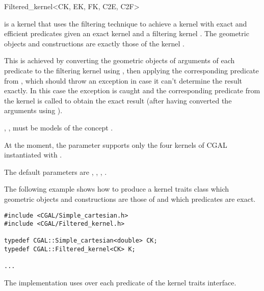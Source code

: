 \begin{ccRefClass}{Filtered_kernel<CK, EK, FK, C2E, C2F>}

\KernelRefLayout\gdef\ccTagOperatorLayout{\ccFalse}

\ccDefinition

\ccClassTemplateName is a kernel that uses the filtering technique
\cite{bbp-iayea-98} to achieve a kernel with exact and efficient predicates
given an exact kernel  and a filtering kernel .  The geometric
objects and constructions are exactly those of the kernel .

This is achieved by converting the geometric objects of  arguments of
each predicate to the filtering kernel  using , then applying
the corresponding predicate from , which should throw an exception in
case it can't determine the result exactly.  In this case the exception is
caught and the corresponding predicate from the kernel  is called to
obtain the exact result (after having converted the arguments using
).

, ,  must be models of the concept .

At the moment, the parameter  supports only the four kernels of
CGAL instantiated with .

The default parameters are ,
  ,
  ,
  .



\ccExample

The following example shows how to produce a kernel traits class  which
geometric objects and constructions are those of
 and which predicates are exact.

\begin{verbatim}
#include <CGAL/Simple_cartesian.h>
#include <CGAL/Filtered_kernel.h>

typedef CGAL::Simple_cartesian<double> CK;
typedef CGAL::Filtered_kernel<CK> K;

...
\end{verbatim}

\ccImplementation
The implementation uses  over
each predicate of the kernel traits interface.

\end{ccRefClass}
